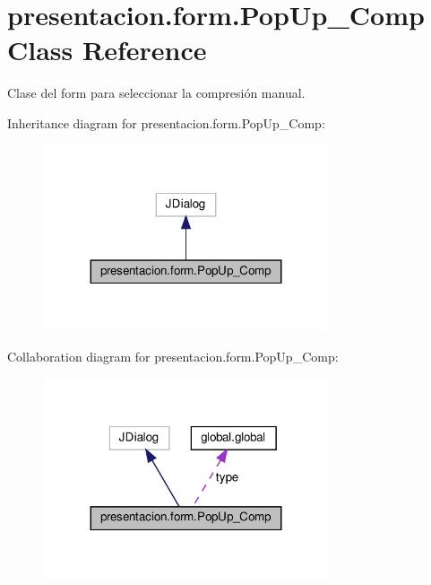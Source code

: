 \hypertarget{classpresentacion_1_1form_1_1PopUp__Comp}{}\section{presentacion.\+form.\+Pop\+Up\+\_\+\+Comp Class Reference}
\label{classpresentacion_1_1form_1_1PopUp__Comp}


Clase del form para seleccionar la compresión manual.  




Inheritance diagram for presentacion.\+form.\+Pop\+Up\+\_\+\+Comp\+:
\nopagebreak
\begin{figure}[H]
\begin{center}
\leavevmode
\includegraphics[width=239pt]{classpresentacion_1_1form_1_1PopUp__Comp__inherit__graph}
\end{center}
\end{figure}


Collaboration diagram for presentacion.\+form.\+Pop\+Up\+\_\+\+Comp\+:
\nopagebreak
\begin{figure}[H]
\begin{center}
\leavevmode
\includegraphics[width=239pt]{classpresentacion_1_1form_1_1PopUp__Comp__coll__graph}
\end{center}
\end{figure}
